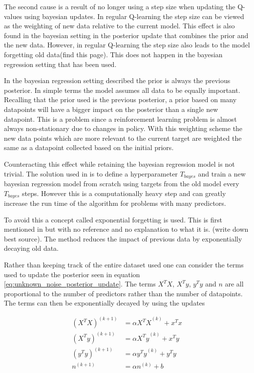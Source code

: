 The second cause is a result of no longer using a step size when updating the Q-values using bayesian updates. In regular Q-learning the step size can be viewed as the weighting of new data relative to the current model. This effect is also found in the bayesian setting in the posterior update that combines the prior and the new data. However, in regular Q-learning the step size also leads to the model forgetting old data(\cite{sutton_barto_2018}\todo find this page). This does not happen in the bayesian regression setting that has been used.

In the bayesian regression setting described the prior is always the previous posterior. In simple terms the model assumes all data to be equally important. Recalling that the prior used is the previous posterior, a prior based on many datapoints will have a bigger impact on the posterior than a single new datapoint. This is a problem since a reinforcement learning problem is almost always non-stationary due to changes in policy. With this weighting scheme the new data points which are more relevant to the current target are weighted the same as a datapoint collected based on the initial priors.

Counteracting this effect while retaining the bayesian regression model is not trivial. The solution used in \cite{azziz_2018} is to define a hyperparameter $T_{bayes}$ and train a new bayesian regression model from scratch using targets from the old model every $T_{bayes}$ steps. However this is a computationally heavy step and can greatly increase the run time of the algorithm for problems with many predictors. 

To avoid this a concept called exponential forgetting is used. This is first mentioned in \cite{dearden_1998} but with no reference and no explanation to what it is. (\todo write down best source). The method reduces the impact of previous data by exponentially decaying old data.

Rather than keeping track of the entire dataset used one can consider the terms used to update the posterior seen in equation \ref{eq:unknown_noise_posterior_update}. The terms $X^TX$, $X^Ty$, $y^Ty$ and $n$ are all proportional to the number of predictors rather than the number of datapoints. The terms can then be exponentially decayed by using the updates 

\begin{align}
(X^TX)^{(k+1)} &= \alpha{X^TX}^{(k)} + x^Tx \\
(X^Ty)^{(k+1)} &= \alpha{X^Ty}^{(k)} + x^Ty \\
(y^Ty)^{(k+1)} &= \alpha{y^Ty}^{(k)} + y^Ty \\
n^{(k+1)} &= \alpha n^{(k)} + b 
\end{align}

